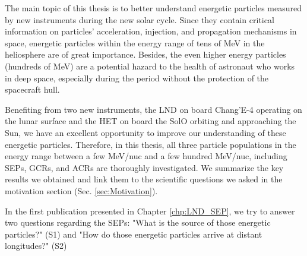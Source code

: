

The main topic of this thesis is to better understand energetic particles measured by new instruments during the new solar cycle. 
Since they contain critical information on particles' acceleration, injection, and propagation mechanisms in space, 
energetic particles within the energy range of tens of MeV in the heliosphere are of great importance. Besides, the even higher energy particles (hundreds of MeV) are a potential hazard to the health of astronaut who works in deep space, especially during the period without the protection of the spacecraft hull.

Benefiting from two new instruments, the \ac{LND} on board Chang'E-4 operating on the lunar surface and the \ac{HET} on board the \ac{SolO} orbiting and approaching the Sun, we have an excellent opportunity to improve our understanding of these energetic particles.
Therefore, in this thesis, all three particle populations in the energy range between a few MeV/nuc and a few hundred MeV/nuc, including \acp{SEP}, \acp{GCR}, and \acp{ACR} are thoroughly investigated. We summarize the key results we obtained and link them to the scientific questions we asked in the motivation section (Sec. \ref{sec:Motivation}). 


In the first publication presented in Chapter \ref{chp:LND_SEP}, we try to answer two questions regarding the \acp{SEP}: "What is the source of those energetic particles?" (S1) and "How do those energetic particles arrive at distant longitudes?" (S2)
 
